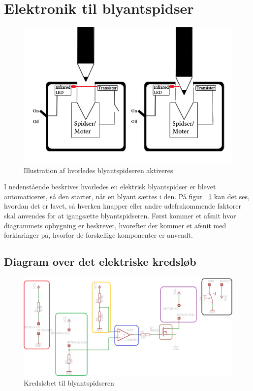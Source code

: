 \section{Elektronik til blyantspidser}
\begin{figure}[h]
	\begin{center}
	\includegraphics[scale=0.4]{Billeder/illustratzion.png}
	\caption{Illustration af hvorledes blyantspidseren aktiveres}\label{fig:spidser}
	\end{center}
\end{figure}
I nedenstående beskrives hvorledes en elektrisk blyantspidser er blevet automaticeret, så den starter, når en blyant sættes i den. På figur ~\ref{fig:spidser} kan det ses, hvordan det er lavet, så hverken knapper eller andre udefrakommende faktorer skal anvendes for at igangsætte blyantspidseren. Først kommer et afsnit hvor diagrammets opbygning er beskrevet, hvorefter der kommer et afsnit med forklaringer på, hvorfor de forskellige komponenter er anvendt. 

\subsection{Diagram over det elektriske kredsløb}

\begin{figure}[h]
	\begin{center}
	\includegraphics[scale=0.4]{Billeder/Elektronik-schmatic-farver-v2.png}
	\caption{Kredsløbet til blyantspidseren}\label{fig:kredslob}
	\end{center}
\end{figure}

